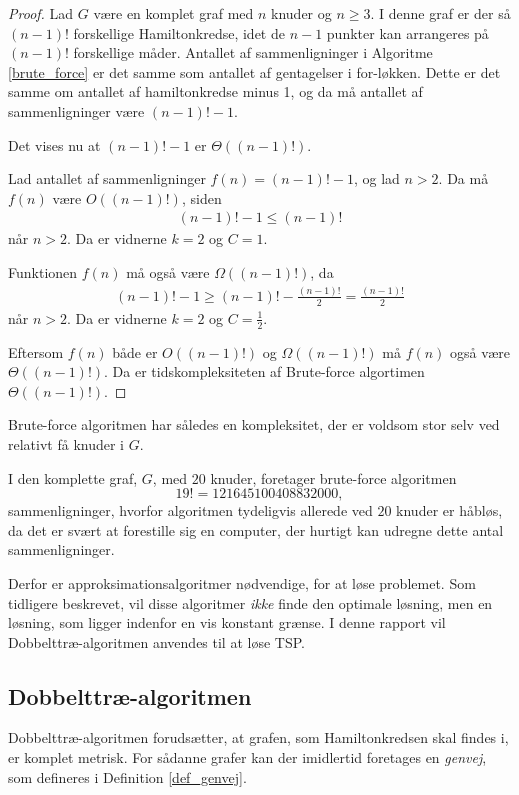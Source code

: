 \begin{proof}
	Lad $G$ være en komplet graf med $n$ knuder og $n \geq 3$.
	I denne graf er der så $(n-1)!$ forskellige Hamiltonkredse, idet de $n-1$ punkter kan arrangeres på $(n-1)!$ forskellige måder.
	Antallet af sammenligninger i Algoritme \ref{brute_force} er det samme som antallet af gentagelser i for-løkken.
	Dette er det samme om antallet af hamiltonkredse minus 1, og da må antallet af sammenligninger være $(n-1)! -1$.  	

	Det vises nu at $(n-1)! -1$ er $\Theta((n-1)!)$.

	Lad antallet af sammenligninger $f(n) = (n-1)! -1$, og lad $n > 2$.
	Da må $f(n)$ være $O((n-1)!)$, siden
	\begin{align*}
		(n-1)! -1 \leq (n-1)!
	\end{align*}
	når $n>2$. Da er vidnerne $k=2$ og $C=1$.
	
	Funktionen $f(n)$ må også være $\Omega((n-1)!)$, da
	\begin{align*}
		(n-1)! -1 \geq (n-1)! - \frac{(n-1)!}{2} = \frac{(n-1)!}{2}
	\end{align*}
	når $n>2$. Da er vidnerne $k=2$ og $C=\frac{1}{2}$.

	Eftersom $f(n)$ både er $O((n-1)!)$ og $\Omega((n-1)!)$ må $f(n)$ også være $\Theta((n-1)!)$. Da er tidskompleksiteten af Brute-force algortimen $\Theta((n-1)!)$.
\end{proof}

Brute-force algoritmen har således en kompleksitet, der er voldsom stor selv ved relativt få knuder i $G$.

\begin{exmp}
I den komplette graf, $G$, med $20$ knuder, foretager brute-force algoritmen $$19! = 121645100408832000,$$ sammenligninger, hvorfor algoritmen tydeligvis allerede ved $20$ knuder er håbløs, da det er svært at forestille sig en computer, der hurtigt kan udregne dette antal sammenligninger.
\end{exmp}

Derfor er approksimationsalgoritmer nødvendige, for at løse problemet. Som tidligere beskrevet, vil disse algoritmer \textit{ikke} finde den optimale løsning, men en løsning, som ligger indenfor en vis konstant grænse. I denne rapport vil Dobbelttræ-algoritmen anvendes til at løse TSP. 

\subsection{Dobbelttræ-algoritmen}
Dobbelttræ-algoritmen forudsætter, at grafen, som Hamiltonkredsen skal findes i, er komplet metrisk. For sådanne grafer kan der imidlertid foretages en \textit{genvej}, som defineres i Definition \ref{def_genvej}.

